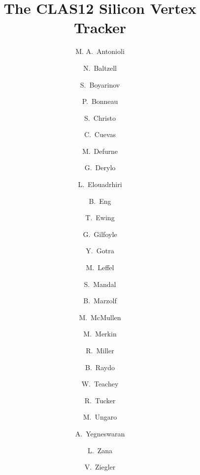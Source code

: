 \title{The CLAS12 Silicon Vertex Tracker}

\author[A]{M. A.~Antonioli}
\author[A]{N.~Baltzell}
\author[A]{S.~Boyarinov}
\author[A]{P.~Bonneau}
\author[A]{S.~Christo}
\author[A]{C.~Cuevas}
\author[B]{M.~Defurne}
\author[C]{G.~Derylo}
\author[A]{L.~Elouadrhiri}
\author[A]{B.~Eng}
\author[A]{T.~Ewing}
\author[D]{G.~Gilfoyle}
\author[A]{Y.~Gotra}
\author[A]{M.~Leffel}
\author[A]{S.~Mandal}
\author[A]{B.~Marzolf}
\author[A]{M.~McMullen}
\author[E]{M.~Merkin}
\author[A]{R.~Miller}
\author[A]{B.~Raydo}
\author[A]{W.~Teachey}
\author[F]{R.~Tucker}
\author[A]{M.~Ungaro}
\author[A]{A.~Yegneswaran}
\author[A]{L.~Zana}
\author[A]{V.~Ziegler}

\address[A]{Thomas Jefferson National Accelerator Facility, Newport News, VA 23606, USA}
\address[B]{CEA-Saclay, Universit\'e Paris-Saclay, 91191, Gif-sur-Yvette, France}
\address[C]{Fermi National Accelerator Laboratory, Batavia, IL 60510, USA}
\address[D]{University of Richmond, Richmond, VA 23173, USA}
\address[E]{Skobeltsyn Institute of Nuclear Physics, Lomonosov Moscow State University, 119234 Moscow, Russia}
\address[F]{Arizona State University, Tempe, AZ 85287, USA}

